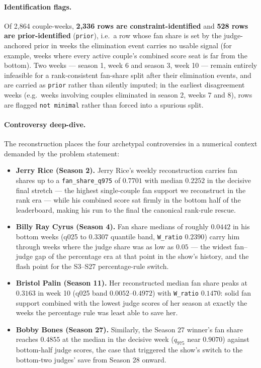 \documentclass[11pt]{article}
\begin{document}
\paragraph{Identification flags.} Of 2{,}864 couple-weeks, \textbf{2{,}336 rows are
constraint-identified} and \textbf{528 rows are prior-identified} (\texttt{prior}), i.e.\ a
row whose fan share is set by the judge-anchored prior in weeks the elimination event
carries no usable signal (for example, weeks where every active couple's combined score
seat is far from the bottom). Two weeks --- season 1, week 6 and season 3, week 10 ---
remain entirely infeasible for a rank-consistent fan-share split after their elimination
events, and are carried as \texttt{prior} rather than silently imputed; in the earliest
disagreement weeks (e.g.\ weeks involving couples eliminated in season 2, weeks 7 and 8),
rows are flagged \texttt{not minimal} rather than forced into a spurious split.

\paragraph{Controversy deep-dive.} The reconstruction places the four archetypal
controversies in a numerical context demanded by the problem statement:
\begin{itemize}
\item \textbf{Jerry Rice (Season 2).} Jerry Rice's weekly reconstruction carries fan
shares up to a \texttt{fan\_share\_q975} of $0.7701$ with median $0.2252$ in the decisive
final stretch --- the highest single-couple fan support we reconstruct in the rank era
--- while his combined score sat firmly in the bottom half of the leaderboard, making his
run to the final the canonical rank-rule rescue.
\item \textbf{Billy Ray Cyrus (Season 4).} Fan share medians of roughly
$0.0442$ in his bottom weeks (q025 to $0.3307$ quantile band, \texttt{W\_ratio} $0.2390$)
carry him through weeks where the judge share was as low as $0.05$ --- the widest
fan--judge gap of the percentage era at that point in the show's history, and the flash
point for the S3--S27 percentage-rule switch.
\item \textbf{Bristol Palin (Season 11).} Her reconstructed median fan share peaks at
$0.3163$ in week 10 (q025 band $0.0052$--$0.4972$) with \texttt{W\_ratio} $0.1470$: solid
fan support combined with the lowest judge scores of her season at exactly the weeks the
percentage rule was least able to save her.
\item \textbf{Bobby Bones (Season 27).} Similarly, the Season 27 winner's fan share
reaches $0.4855$ at the median in the decisive week ($q_{975}$ near $0.9070$) against
bottom-half judge scores, the case that triggered the show's switch to the bottom-two
judges' save from Season 28 onward.
\end{itemize}
\end{document}
